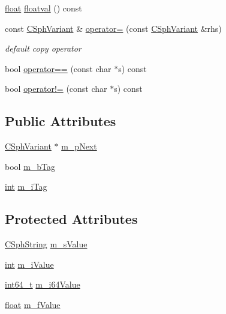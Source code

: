 \begin{DoxyCompactItemize}
\item 
\hyperlink{sphinxexpr_8cpp_a0e0d0739f7035f18f949c2db2c6759ec}{float} \hyperlink{structCSphVariant_a9dd347d014db39b583ea270b57d1e9ae}{floatval} () const 
\item 
const \hyperlink{structCSphVariant}{C\-Sph\-Variant} \& \hyperlink{structCSphVariant_ac546c5d272c1c63fd28520482b0c0ad3}{operator=} (const \hyperlink{structCSphVariant}{C\-Sph\-Variant} \&rhs)
\begin{DoxyCompactList}\small\item\em default copy operator \end{DoxyCompactList}\item 
bool \hyperlink{structCSphVariant_a3ffa97c18ac2f4b068fa8bcc9103a261}{operator==} (const char $\ast$s) const 
\item 
bool \hyperlink{structCSphVariant_a1c79d73235f1ca9d36e56b8d951dd13a}{operator!=} (const char $\ast$s) const 
\end{DoxyCompactItemize}
\subsection*{Public Attributes}
\begin{DoxyCompactItemize}
\item 
\hyperlink{structCSphVariant}{C\-Sph\-Variant} $\ast$ \hyperlink{structCSphVariant_a01737970e93eded1ef575b6b94264df2}{m\-\_\-p\-Next}
\item 
bool \hyperlink{structCSphVariant_af8110026039321dacc1dcab6ccf9d1cb}{m\-\_\-b\-Tag}
\item 
\hyperlink{sphinxexpr_8cpp_a4a26e8f9cb8b736e0c4cbf4d16de985e}{int} \hyperlink{structCSphVariant_a971357e0cbfc577bb74b162cd32e5b50}{m\-\_\-i\-Tag}
\end{DoxyCompactItemize}
\subsection*{Protected Attributes}
\begin{DoxyCompactItemize}
\item 
\hyperlink{structCSphString}{C\-Sph\-String} \hyperlink{structCSphVariant_af9974f67d953c0257675234c22608a29}{m\-\_\-s\-Value}
\item 
\hyperlink{sphinxexpr_8cpp_a4a26e8f9cb8b736e0c4cbf4d16de985e}{int} \hyperlink{structCSphVariant_a072659b1b0b948e83f981b0fd1abf7da}{m\-\_\-i\-Value}
\item 
\hyperlink{sphinxstd_8h_a996e72f71b11a5bb8b3b7b6936b1516d}{int64\-\_\-t} \hyperlink{structCSphVariant_a6f7e8f7afd6d3464c82bed27c83b68c8}{m\-\_\-i64\-Value}
\item 
\hyperlink{sphinxexpr_8cpp_a0e0d0739f7035f18f949c2db2c6759ec}{float} \hyperlink{structCSphVariant_a7a8ccf942ef67957310fc73279a527f5}{m\-\_\-f\-Value}
\end{DoxyCompactItemize}


